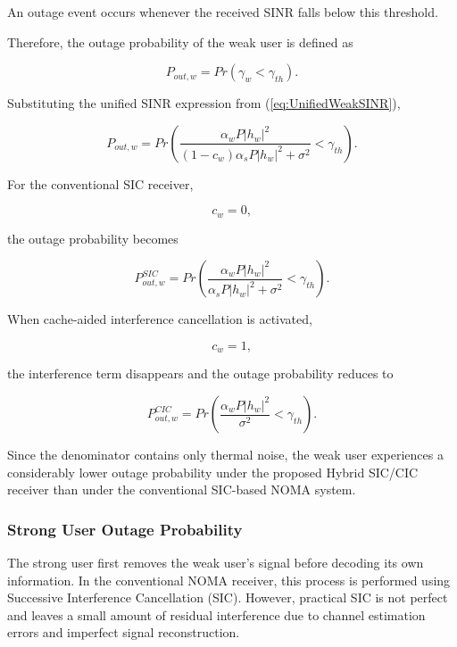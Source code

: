\documentclass[12pt,a4paper]{article}
\begin{document}
An outage event occurs whenever the received SINR falls below this threshold.

Therefore, the outage probability of the weak user is defined as

\begin{equation}
P_{out,w}
=
Pr
\left(
\gamma_w
<
\gamma_{th}
\right).
\end{equation}

Substituting the unified SINR expression from (\ref{eq:UnifiedWeakSINR}),

\begin{equation}
P_{out,w}
=
Pr
\left(
\frac{\alpha_wP|h_w|^2}
{(1-c_w)\alpha_sP|h_w|^2+\sigma^2}
<
\gamma_{th}
\right).
\end{equation}

For the conventional SIC receiver,

\[
c_w=0,
\]

the outage probability becomes

\begin{equation}
P_{out,w}^{SIC}
=
Pr
\left(
\frac{\alpha_wP|h_w|^2}
{\alpha_sP|h_w|^2+\sigma^2}
<
\gamma_{th}
\right).
\end{equation}

When cache-aided interference cancellation is activated,

\[
c_w=1,
\]

the interference term disappears and the outage probability reduces to

\begin{equation}
P_{out,w}^{CIC}
=
Pr
\left(
\frac{\alpha_wP|h_w|^2}
{\sigma^2}
<
\gamma_{th}
\right).
\end{equation}

Since the denominator contains only thermal noise, the weak user experiences a considerably lower outage probability under the proposed Hybrid SIC/CIC receiver than under the conventional SIC-based NOMA system.
\subsubsection{Strong User Outage Probability}

The strong user first removes the weak user's signal before decoding its own information. In the conventional NOMA receiver, this process is performed using Successive Interference Cancellation (SIC). However, practical SIC is not perfect and leaves a small amount of residual interference due to channel estimation errors and imperfect signal reconstruction.
\end{document}
